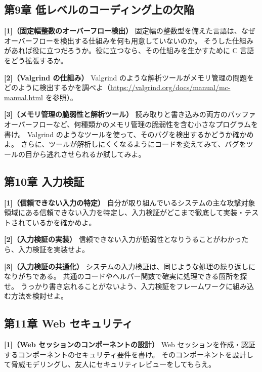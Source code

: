 \documentclass[uplatex]{jsarticle}
\begin{document}
\subsection{第9章 低レベルのコーディング上の欠陥}

\noindent\textbf{[1]（固定幅整数のオーバーフロー検出）}\quad
固定幅の整数型を備えた言語は、なぜオーバーフローを検出する仕組みを何も用意していないのか。
そうした仕組みがあれば役に立つだろうか。役に立つなら、その仕組みを生かすために C 言語をどう拡張するか。

\noindent\textbf{[2]（Valgrind の仕組み）}\quad
Valgrind のような解析ツールがメモリ管理の問題をどのように検出するかを調べよ（\url{https://valgrind.org/docs/manual/mc-manual.html} を参照）。

\noindent\textbf{[3]（メモリ管理の脆弱性と解析ツール）}\quad
読み取りと書き込みの両方のバッファオーバーフローなど、何種類かのメモリ管理の脆弱性を含む小さなプログラムを書け。
Valgrind のようなツールを使って、そのバグを検出するかどうか確かめよ。
さらに、ツールが解析しにくくなるようにコードを変えてみて、バグをツールの目から逃れさせられるか試してみよ。

\subsection{第10章 入力検証}

\noindent\textbf{[1]（信頼できない入力の特定）}\quad
自分が取り組んでいるシステムの主な攻撃対象領域にある信頼できない入力を特定し、入力検証がどこまで徹底して実装・テストされているかを確かめよ。

\noindent\textbf{[2]（入力検証の実装）}\quad
信頼できない入力が脆弱性となりうることがわかったら、入力検証を実装せよ。

\noindent\textbf{[3]（入力検証の共通化）}\quad
システムの入力検証は、同じような処理の繰り返しになりがちである。
共通のコードやヘルパー関数で確実に処理できる箇所を探せ。
うっかり書き忘れることがないよう、入力検証をフレームワークに組み込む方法を検討せよ。

\subsection{第11章 Web セキュリティ}

\noindent\textbf{[1]（Web セッションのコンポーネントの設計）}\quad
Web セッションを作成・認証するコンポーネントのセキュリティ要件を書け。
そのコンポーネントを設計して脅威モデリングし、友人にセキュリティレビューをしてもらえ。
\end{document}
